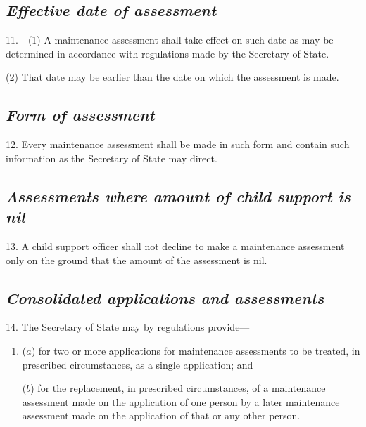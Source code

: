 \documentclass[12pt,a4paper]{article}
\begin{document}
\renewcommand\parthead{--- Schedule 1 Part II}

\subsection*{\itshape Effective date of assessment}

11.---(1) A maintenance assessment shall take effect on such date as may be determined in accordance with regulations made by the Secretary of State.

(2) That date may be earlier than the date on which the assessment is made.


\subsection*{\itshape Form of assessment}

12. Every maintenance assessment shall be made in such form and contain such information as the Secretary of State may direct.

\subsection*{\itshape Assessments where amount of child support is nil}

13. 
A child support officer 
shall not decline to make a maintenance assessment only on the ground that the amount of the assessment is nil.


\subsection*{\itshape Consolidated applications and assessments}

14. The Secretary of State may by regulations provide—
\begin{enumerate}\item[]
($a$) for two or more applications for maintenance assessments to be treated, in prescribed circumstances, as a single application; and

($b$) for the replacement, in prescribed circumstances, of a maintenance assessment made on the application of one person by a later maintenance assessment made on the application of that or any other person.
\end{enumerate}
\end{document}
